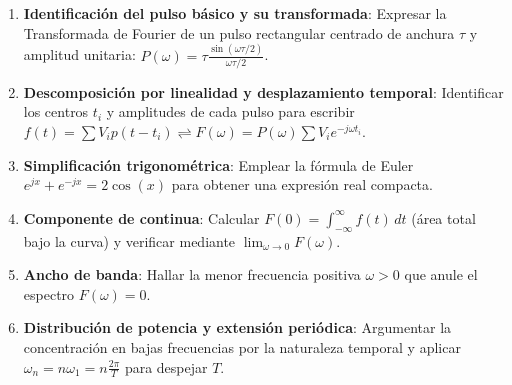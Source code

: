 \begin{mecanizado}
\begin{enumerate}
    \item \textbf{Identificación del pulso básico y su transformada}: Expresar la Transformada de Fourier de un pulso rectangular centrado de anchura $\tau$ y amplitud unitaria: $P(\omega) = \tau \frac{\sin(\omega\tau/2)}{\omega\tau/2}$.
    \item \textbf{Descomposición por linealidad y desplazamiento temporal}: Identificar los centros $t_i$ y amplitudes de cada pulso para escribir $f(t) = \sum V_i p(t - t_i) \rightleftharpoons F(\omega) = P(\omega) \sum V_i e^{-j\omega t_i}$.
    \item \textbf{Simplificación trigonométrica}: Emplear la fórmula de Euler $e^{jx} + e^{-jx} = 2\cos(x)$ para obtener una expresión real compacta.
    \item \textbf{Componente de continua}: Calcular $F(0) = \int_{-\infty}^{\infty} f(t) \, dt$ (área total bajo la curva) y verificar mediante $\lim_{\omega \to 0} F(\omega)$.
    \item \textbf{Ancho de banda}: Hallar la menor frecuencia positiva $\omega > 0$ que anule el espectro $F(\omega) = 0$.
    \item \textbf{Distribución de potencia y extensión periódica}: Argumentar la concentración en bajas frecuencias por la naturaleza temporal y aplicar $\omega_n = n \omega_1 = n \frac{2\pi}{T}$ para despejar $T$.
\end{enumerate}
\end{mecanizado}

